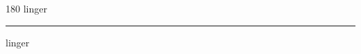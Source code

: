 
\begin{frame}
\begin{center}
\begin{turn}{180}
{\fontsize{2.5cm}{1em}\selectfont linger}
\end{turn}
\vspace{1em}\par  
\hrule
\vspace{1em}\par  
{\fontsize{2.5cm}{1em}\selectfont linger}
\end{center}
\end{frame}
